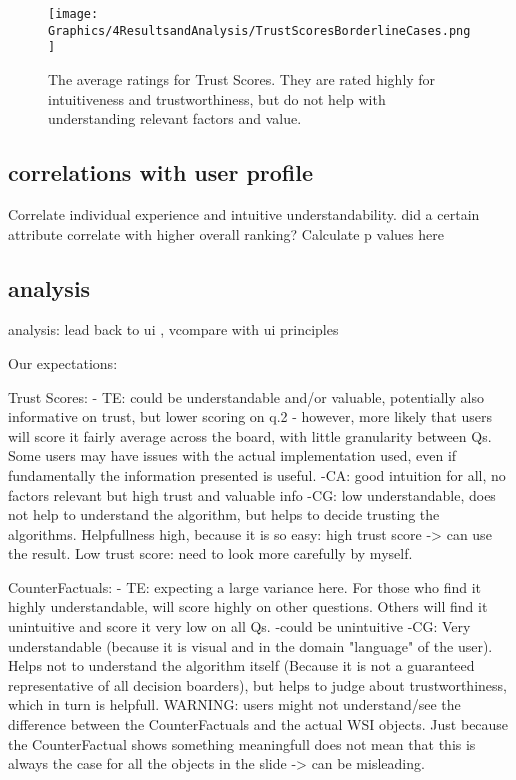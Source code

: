 \begin{figure}
    \centering
    \texttt{[image: Graphics/4ResultsandAnalysis/TrustScoresBorderlineCases.png]}
    \caption{The average ratings for Trust Scores. They are rated highly for intuitiveness and trustworthiness, but do not help with understanding relevant factors and value.}
    \label{fig:trust_scores}
\end{figure}

\subsection{correlations with user profile}

Correlate individual experience and intuitive understandability. did a certain attribute correlate with higher overall ranking? Calculate p values here

\subsection{analysis}

analysis: lead back to ui , vcompare with ui principles

Our expectations:

Trust Scores:
- TE: could be understandable and/or valuable, potentially also informative on trust, but lower scoring on q.2 - however, more likely that users will score it fairly average across the board, with little granularity between Qs. Some users may have issues with the actual implementation used, even if fundamentally the information presented is useful.  
-CA: good intuition for all, no factors relevant but high trust and valuable info
-CG: low understandable, does not help to understand the algorithm, but helps to decide trusting the algorithms. Helpfullness high, because it is so easy: high trust score -> can use the result. Low trust score: need to look more carefully by myself.

CounterFactuals:
- TE: expecting a large variance here. For those who  find it highly understandable, will score highly on other questions. Others will find it unintuitive and score it very low on all Qs.
-could be unintuitive
-CG: Very understandable (because it is visual and in the domain "language" of the user). Helps not to understand the algorithm itself (Because it is not a guaranteed representative of all decision boarders), but helps to judge about trustworthiness, which in turn is helpfull. WARNING: users might not understand/see the difference between the CounterFactuals and the actual WSI objects. Just because the CounterFactual shows something meaningfull does not mean that this is always the case for all the objects in the slide -> can be misleading.


